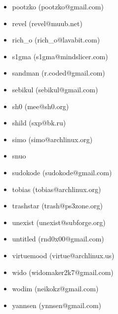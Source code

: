 \begin{latin}
\begin{itemize}
\item  pootzko (pootzko@gmail.com)
\item  revel (revel@muub.net)
\item  rich\_o (rich\_o@lavabit.com)
\item  s1gma (s1gma@mindslicer.com)
\item  sandman (r.coded@gmail.com)
\item  sebikul (sebikul@gmail.com)
\item  sh0 (mee@sh0.org)
\item  shild (sxp@bk.ru)
\item  simo (simo@archlinux.org)
\item  snuo
\item  sudokode (sudokode@gmail.com)
\item  tobias (tobias@archlinux.org)
\item  trashstar (trash@ps3zone.org)
\item  unexist (unexist@subforge.org)
\item  untitled (rnd0x00@gmail.com)
\item  virtuemood (virtue@archlinux.us)
\item  wido (widomaker2k7@gmail.com)
\item  wodim (neikokz@gmail.com)
\item  yannsen (ynnsen@gmail.com)
\end{itemize}
\end{latin}
